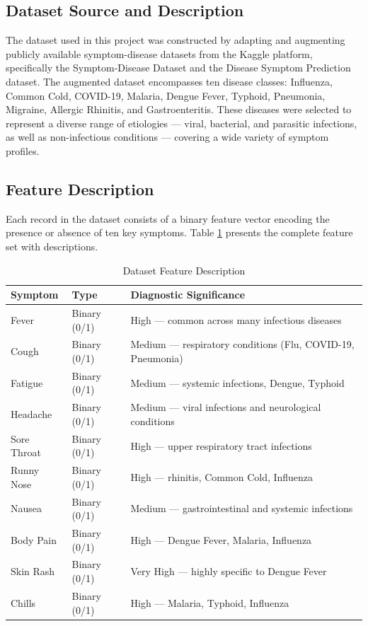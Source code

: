 \documentclass[12pt,a4paper]{article}
\begin{document}
\subsection{Dataset Source and Description}

The dataset used in this project was constructed by adapting and augmenting publicly available symptom-disease datasets from the Kaggle platform, specifically the Symptom-Disease Dataset and the Disease Symptom Prediction dataset. The augmented dataset encompasses ten disease classes: Influenza, Common Cold, COVID-19, Malaria, Dengue Fever, Typhoid, Pneumonia, Migraine, Allergic Rhinitis, and Gastroenteritis. These diseases were selected to represent a diverse range of etiologies --- viral, bacterial, and parasitic infections, as well as non-infectious conditions --- covering a wide variety of symptom profiles.

\subsection{Feature Description}

Each record in the dataset consists of a binary feature vector encoding the presence or absence of ten key symptoms. Table \ref{tab:features} presents the complete feature set with descriptions.

\begin{table}[H]
\centering
\caption{Dataset Feature Description}
\label{tab:features}
\begin{tabular}{llp{6cm}}
\toprule
\textbf{Symptom} & \textbf{Type} & \textbf{Diagnostic Significance} \\
\midrule
Fever        & Binary (0/1) & High --- common across many infectious diseases \\
Cough        & Binary (0/1) & Medium --- respiratory conditions (Flu, COVID-19, Pneumonia) \\
Fatigue      & Binary (0/1) & Medium --- systemic infections, Dengue, Typhoid \\
Headache     & Binary (0/1) & Medium --- viral infections and neurological conditions \\
Sore Throat  & Binary (0/1) & High --- upper respiratory tract infections \\
Runny Nose   & Binary (0/1) & High --- rhinitis, Common Cold, Influenza \\
Nausea       & Binary (0/1) & Medium --- gastrointestinal and systemic infections \\
Body Pain    & Binary (0/1) & High --- Dengue Fever, Malaria, Influenza \\
Skin Rash    & Binary (0/1) & Very High --- highly specific to Dengue Fever \\
Chills       & Binary (0/1) & High --- Malaria, Typhoid, Influenza \\
\bottomrule
\end{tabular}
\end{table}
\end{document}
